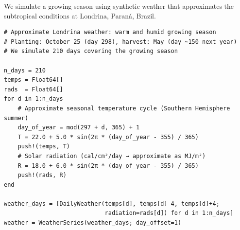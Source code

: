 \label{3850430068929629454}{}


We simulate a growing season using synthetic weather that approximates the subtropical conditions at Londrina, Paraná, Brazil.




\begin{verbatim}
# Approximate Londrina weather: warm and humid growing season
# Planting: October 25 (day 298), harvest: May (day ~150 next year)
# We simulate 210 days covering the growing season

n_days = 210
temps = Float64[]
rads  = Float64[]
for d in 1:n_days
    # Approximate seasonal temperature cycle (Southern Hemisphere summer)
    day_of_year = mod(297 + d, 365) + 1
    T = 22.0 + 5.0 * sin(2π * (day_of_year - 355) / 365)
    push!(temps, T)
    # Solar radiation (cal/cm²/day → approximate as MJ/m²)
    R = 18.0 + 6.0 * sin(2π * (day_of_year - 355) / 365)
    push!(rads, R)
end

weather_days = [DailyWeather(temps[d], temps[d]-4, temps[d]+4;
                             radiation=rads[d]) for d in 1:n_days]
weather = WeatherSeries(weather_days; day_offset=1)
\end{verbatim}




